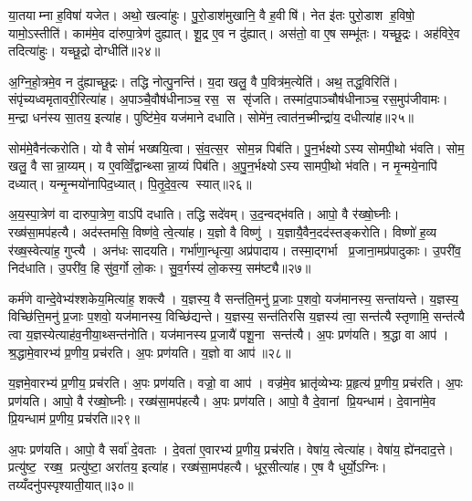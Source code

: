 या॒तयाम्ना ह॒विषा॑ यजेत। अथो॒ खल्वा॑हुः। पु॒रो॒डाश॑मुखानि॒ वै ह॒वीषि॑। नेत इ॑तः पुरो॒डाश ह॒विषो॒ यामो॒ऽस्तीति॑। काम॑मे॒व दा॑रुपा॒त्रेण॑ दुह्यात्। शू॒द्र ए॒व न दु॑ह्यात्। अस॑तो॒ वा ए॒ष सम्भू॑तः। यच्छू॒द्रः। अह॑विरे॒व तदित्या॑हुः। यच्छू॒द्रो दोग्धीति॑॥२४॥

अ॒ग्नि॒हो॒त्रमे॒व न दु॑ह्याच्छू॒द्रः। तद्धि नोत्पु॒नन्ति॑। य॒दा खलु॒ वै प॒वित्र॑म॒त्येति॑। अथ॒ तद्ध॒विरिति॑। संपृ॑च्यध्वमृतावरी॒रित्या॑ह। अ॒पाञ्चै॒वौष॑धीनाञ्च॒ रस॒ स सृ॑जति। तस्मा॑द॒पाञ्चौष॑धीनाञ्च॒ रस॒मुप॑जीवामः। म॒न्द्रा धन॑स्य सा॒तय॒ इत्या॑ह। पुष्टि॑मे॒व यज॑माने दधाति। सोमे॑न॒ त्वात॑न॒च्मीन्द्रा॑य॒ दधीत्या॑ह॥२५॥

सोम॑मे॒वैन॑त्करोति। यो वै सोमं॑ भख्षयि॒त्वा। सं॒व॒त्स॒र सोम॒न्न पिब॑ति। पु॒न॒र्भक्ष्योऽस्य सोमपी॒थो भ॑वति। सोम॒ खलु॒ वै सान्ना॒य्यम्। य ए॒वव्विँ॒द्वान्थ्सान्ना॒य्यं पिब॑ति। अ॒पु॒न॒र्भक्ष्योऽस्य सामपी॒थो भ॑वति। न मृ॒न्मये॒नापि॑ दध्यात्। यन्मृ॒न्मयो॑नापिद॒ध्यात्। पि॒तृ॒दे॒व॒त्य स्यात्॥२६॥

अ॒य॒स्पा॒त्रेण॑ वा दारुपा॒त्रेण॒ वाऽपि॑ दधाति। तद्धि सदे॑वम्। उ॒द॒न्वद्भ॑वति। आपो॒ वै र॑ख्षो॒घ्नीः। रख्ष॑सा॒मप॑हत्यै। अद॑स्तमसि॒ विष्ण॑वे॒ त्वे॒त्या॑ह। य॒ज्ञो वै विष्णु॑। य॒ज्ञायै॒वैन॒दद॑स्तङ्करोति। विष्णो॑ ह॒व्य र॑ख्ष॒स्वेत्या॑ह॒ गुप्त्यै। अन॑धः सादयति। गर्भा॑णा॒न्धृत्या॒ अप्र॑पादाय। तस्मा॒द्गर्भा प्र॒जाना॒मप्र॑पादुकाः। उ॒परी॑व॒ निद॑धाति। उ॒परी॑व॒ हि सु॑व॒र्गो लो॒कः। सु॒व॒र्गस्य॑ लो॒कस्य॒ सम॑ष्ट्यै॥२७॥

कर्म॑णे वान्दे॒वेभ्य॑श्शकेय॒मित्या॑ह॒ शक्त्यै। य॒ज्ञस्य॒ वै सन्त॑ति॒मनु॑ प्र॒जाः प॒शवो॒ यज॑मानस्य॒ सन्ता॑यन्ते। य॒ज्ञस्य॒ विच्छि॑त्ति॒मनु॑ प्र॒जाः प॒शवो॒ यज॑मानस्य॒ विच्छि॑द्यन्ते। य॒ज्ञस्य॒ सन्त॑तिरसि य॒ज्ञस्य॑ त्वा॒ सन्त॑त्यै स्तृणामि॒ सन्त॑त्यै त्वा य॒ज्ञस्येत्याह॑व॒नीया॒थ्सन्त॑नोति। यज॑मानस्य प्र॒जायै॑ पशू॒ना सन्त॑त्यै। अ॒पः प्रण॑यति। श्र॒द्धा वा आप॑। श्र॒द्धामे॒वारभ्य॑ प्र॒णीय॒ प्रच॑रति। अ॒पः प्रण॑यति। य॒ज्ञो वा आप॑॥२८॥

य॒ज्ञमे॒वारभ्य॑ प्र॒णीय॒ प्रच॑रति। अ॒पः प्रण॑यति। वज्रो॒ वा आप॑। वज्र॑मे॒व भ्रातृ॑व्येभ्यः प्र॒हृत्य॑ प्र॒णीय॒ प्रच॑रति। अ॒पः प्रण॑यति। आपो॒ वै र॑ख्षो॒घ्नीः। रख्ष॑सा॒मप॑हत्यै। अ॒पः प्रण॑यति। आपो॒ वै दे॒वानां प्रि॒यन्धाम॑। दे॒वाना॑मे॒व प्रि॒यन्धाम॑ प्र॒णीय॒ प्रच॑रति॥२९॥

अ॒पः प्रण॑यति। आपो॒ वै सर्वा॑ दे॒वताः। दे॒वता॑ ए॒वारभ्य॑ प्र॒णीय॒ प्रच॑रति। वेषा॑य॒ त्वेत्या॑ह। वेषा॑य॒ ह्ये॑नदाद॒त्ते। प्रत्यु॑ष्ट॒ रख्ष॒ प्रत्यु॑ष्टा॒ अरा॑तय॒ इत्या॑ह। रख्ष॑सा॒मप॑हत्यै। धूर॒सीत्या॑ह। ए॒ष वै धुर्यो॒ऽग्निः। तय्यँदनु॑पस्पृश्याती॒यात्॥३०॥

